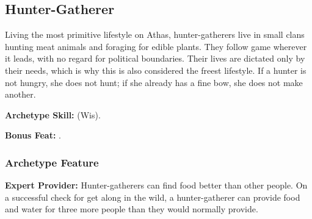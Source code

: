 \subsection{Hunter-Gatherer}
Living the most primitive lifestyle on Athas, hunter-gatherers live in small clans  hunting meat animals and foraging for edible plants. They follow game wherever it leads, with no regard for political boundaries. Their lives are dictated only by their needs, which is why this is also considered the freest lifestyle. If a hunter is not hungry, she does not hunt; if she already has a fine bow, she does not make another.

\textbf{Archetype Skill:}  (Wis).

\textbf{Bonus Feat:} .

\subsubsection{Archetype Feature}
\textbf{Expert Provider:} Hunter-gatherers can find food better than other people. On a successful  check for get along in the wild, a hunter-gatherer can provide food and water for three more people than they would normally provide.
